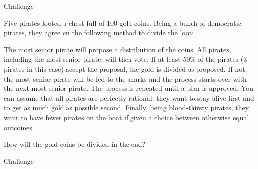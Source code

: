 \begin{tagblock}{Challenge}
\begin{question}[CHALLENGE!!!]

Five pirates looted a chest full of 100 gold coins. Being a bunch of democratic pirates, they agree on the following method to divide the loot:

\bigskip

The most senior pirate will propose a distribution of the coins. All pirates, including the most senior pirate, will then vote. If at least 50\% of the pirates (3 pirates in this case) accept the proposal, the gold is divided as proposed. If not, the most senior pirate will be fed to the sharks and the process starts over with the next most senior pirate. The process is repeated until a plan is approved. You can assume that all pirates are perfectly rational: they want to stay alive first and to get as much gold as possible second. Finally, being blood-thirsty pirates, they want to have fewer pirates on the boat if given a choice between otherwise equal outcomes.

\bigskip

How will the gold coins be divided in the end?
	
	
\begin{tags}
	    Challenge
\end{tags}
	
\begin{diary}
\end{diary}
		
\begin{solution}
       
\end{solution}

\end{question}

\end{tagblock}

